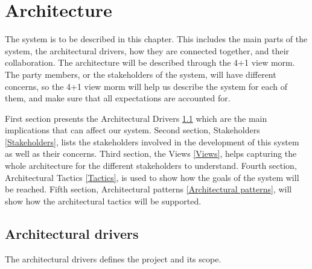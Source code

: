 \chapter{Architecture}

\minitoc

The system is to be described in this chapter. This includes the main parts of the system, the architectural drivers, how they are connected together, and their collaboration. The architecture will be described through the 4+1 view morm. The party members, or the stakeholders of the system, will have different concerns, so the 4+1 view morm will help us describe the system for each of them, and make sure that all expectations are accounted for.

First section presents the Architectural Drivers \ref{Architectural drivers} which are the main implications that can affect our system. Second section, Stakeholders \ref{Stakeholders}, lists the stakeholders involved in the development of this system as well as their concerns. Third section, the Views \ref{Views}, helps capturing the whole architecture for the different stakeholders to understand. Fourth section, Architectural Tactics \ref{Tactics}, is used to show how the goals of the system will be reached. Fifth section, Architectural patterns \ref{Architectural patterns}, will show how the architectural tactics will be supported.

\clearpage


\section{Architectural drivers} \label{Architectural drivers}
The architectural drivers defines the project and its scope.

